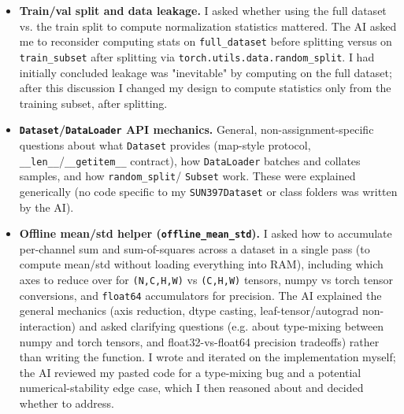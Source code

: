 \begin{itemize}[leftmargin=*]
\item \textbf{Train/val split and data leakage.}
I asked whether using the full dataset vs. the train split to compute normalization
statistics mattered. The AI asked me to reconsider computing stats on \texttt{full\_dataset}
before splitting versus on \texttt{train\_subset} after splitting via
\texttt{torch.utils.data.random\_split}. I had initially concluded leakage was
"inevitable" by computing on the full dataset; after this discussion I changed my design
to compute statistics only from the training subset, after splitting.

\item \textbf{\texttt{Dataset}/\texttt{DataLoader} API mechanics.}
General, non-assignment-specific questions about what \texttt{Dataset} provides
(map-style protocol, \texttt{\_\_len\_\_}/\texttt{\_\_getitem\_\_} contract), how
\texttt{DataLoader} batches and collates samples, and how \texttt{random\_split}/
\texttt{Subset} work. These were explained generically (no code specific to my
\texttt{SUN397Dataset} or class folders was written by the AI).

\item \textbf{Offline mean/std helper (\texttt{offline\_mean\_std}).}
I asked how to accumulate per-channel sum and sum-of-squares across a dataset in a single
pass (to compute mean/std without loading everything into RAM), including which axes to
reduce over for \texttt{(N,C,H,W)} vs \texttt{(C,H,W)} tensors, numpy vs torch tensor
conversions, and \texttt{float64} accumulators for precision. The AI explained the general
mechanics (axis reduction, dtype casting, leaf-tensor/autograd non-interaction) and asked
clarifying questions (e.g. about type-mixing between numpy and torch tensors, and
float32-vs-float64 precision tradeoffs) rather than writing the function. I wrote and
iterated on the implementation myself; the AI reviewed my pasted code for a type-mixing
bug and a potential numerical-stability edge case, which I then reasoned about and decided
whether to address.


\end{itemize}
